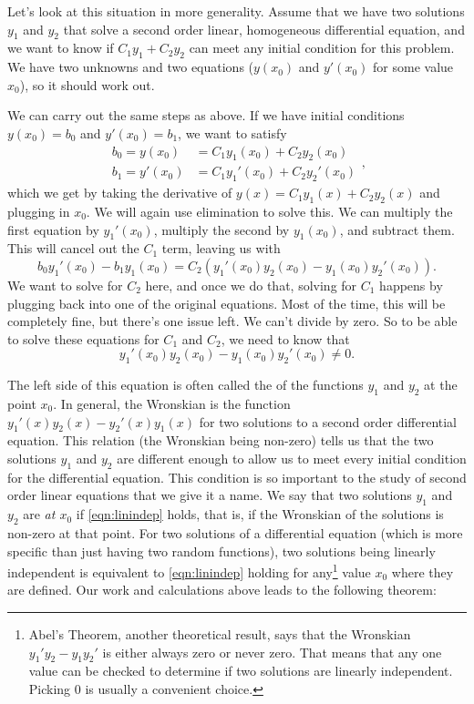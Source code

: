 Let's look at this situation in more generality. Assume that we have two solutions $y_1$ and $y_2$ that solve a second order linear, homogeneous differential equation, and we want to know if $C_1y_1 + C_2y_2$ can meet any initial condition for this problem. We have two unknowns and two equations ($y(x_0)$ and $y'(x_0)$ for some value $x_0$), so it should work out. 

We can carry out the same steps as above. If we have initial conditions $y(x_0) = b_0$ and $y'(x_0) = b_1$, we want to satisfy
\begin{equation*}
\begin{split}
b_0 = y(x_0) &= C_1y_1(x_0) + C_2y_2(x_0) \\
b_1 = y'(x_0) &= C_1y_1'(x_0)  + C_2y_2'(x_0)
\end{split},
\end{equation*}
which we get by taking the derivative of $y(x) = C_1y_1(x) + C_2y_2(x)$ and plugging in $x_0$. We will again use elimination to solve this. We can multiply the first equation by $y_1'(x_0)$, multiply the second by $y_1(x_0)$, and subtract them. This will cancel out the $C_1$ term, leaving us with 
\begin{equation*}
b_0y_1'(x_0) - b_1y_1(x_0) = C_2(y_1'(x_0)y_2(x_0) - y_1(x_0)y_2'(x_0)).
\end{equation*}
We want to solve for $C_2$ here, and once we do that, solving for $C_1$ happens by plugging back into one of the original equations. Most of the time, this will be completely fine, but there's one issue left. We can't divide by zero. So to be able to solve these equations for $C_1$ and $C_2$, we need to know that
\begin{equation}
y_1'(x_0)y_2(x_0) - y_1(x_0)y_2'(x_0) \neq 0.
\label{eqn:linindep}
\end{equation}

The left side of this equation is often called the \emph{} of the functions $y_1$ and $y_2$ at the point $x_0$. In general, the Wronskian is the function $y_1'(x)y_2(x) - y_2'(x)y_1(x)$ for two solutions to a second order differential equation. This relation (the Wronskian being non-zero) tells us that the two solutions $y_1$ and $y_2$ are different enough to allow us to meet every initial condition for the differential equation. This condition is so important to the study of second order linear equations that we give it a name. We say that two solutions $y_1$ and $y_2$ are \emph{ at $x_0$} if \eqref{eqn:linindep} holds, that is, if the Wronskian of the solutions is non-zero at that point. For two solutions of a differential equation (which is more specific than just having two random functions), two solutions being linearly independent is equivalent to \ref{eqn:linindep} holding for any\footnote{%
Abel's Theorem, another theoretical result, says that the Wronskian $y_1'y_2 - y_1y_2'$ is either always zero or never zero. That means that any one value can be checked to determine if two solutions are linearly independent. Picking $0$ is usually a convenient choice.} value $x_0$ where they are defined. Our work and calculations above leads to the following theorem: 

